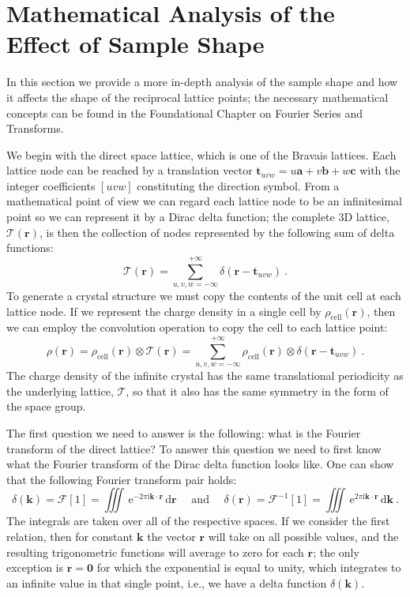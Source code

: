 \section{Mathematical Analysis of the Effect of Sample Shape}\label{\chabbr:sec:sampleshape}
In this section we provide a more in-depth analysis of the sample shape and how it affects the shape of the reciprocal lattice points; the necessary mathematical concepts can be found in the Foundational Chapter on Fourier Series and Transforms.  

We begin with the direct space lattice, which is one of the Bravais lattices.  Each lattice node can be reached by a translation vector $\mathbf{t}_{uvw}=u\mathbf{a}+v\mathbf{b}+w\mathbf{c}$ with the integer coefficients $[uvw]$ constituting the direction symbol.  From a mathematical point of view we can regard each lattice node to be an infinitesimal point so we can represent it by a Dirac delta function; the complete 3D lattice, $\mathcal{T}(\mathbf{r})$, is then the collection of nodes represented by the following sum of delta functions:
\begin{equation}
	\mathcal{T}(\mathbf{r}) = \sum_{u,v,w=-\infty}^{+\infty} \delta(\mathbf{r}-\mathbf{t}_{uvw})\ .\label{\chabbr:eq:directlattice}
\end{equation}
To generate a crystal structure we must copy the contents of the unit cell at each lattice node. If we represent the charge density in a single cell by $\rho_{\text{cell}}(\mathbf{r})$, then we can employ the convolution operation to copy the cell to each lattice point:
\begin{equation}
	\rho(\mathbf{r})=\rho_{\text{cell}}(\mathbf{r})\otimes\mathcal{T}(\mathbf{r})=\sum_{u,v,w=-\infty}^{+\infty} \rho_{\text{cell}}(\mathbf{r})\otimes\delta(\mathbf{r}-\mathbf{t}_{uvw})\ .\label{\chabbr:eq:latticewithcell}
\end{equation}
The charge density of the infinite crystal has the same translational periodicity as the underlying lattice, $\mathcal{T}$, so that it also has the same symmetry in the form of the space group. 

The first question we need to answer is the following: what is the Fourier transform of the direct lattice?  To answer this question we need to first know what the Fourier transform of the Dirac delta function looks like.  One can show that the following Fourier transform pair holds:
\begin{equation}
	\delta(\mathbf{k})=\mathcal{F}[1]=\iiint\,\mathrm{e}^{-2\pi\mathrm{i}\mathbf{k}\cdot\mathbf{r}}\,\mathrm{d}\mathbf{r}\quad\text{ and }\quad \delta(\mathbf{r})=\mathcal{F}^{-1}[1]=\iiint\,\mathrm{e}^{2\pi\mathrm{i}\mathbf{k}\cdot\mathbf{r}}\,\mathrm{d}\mathbf{k}\ .\label{\chabbr:eq:deltaFT}
\end{equation}
The integrals are taken over all of the respective spaces. If we consider the first relation, then for constant $\mathbf{k}$ the vector $\mathbf{r}$ will take on all possible values, and the resulting trigonometric functions will average to zero for each $\mathbf{r}$; the only exception is $\mathbf{r}=\mathbf{0}$ for which the exponential is equal to unity, which integrates to an infinite value in that single point, i.e., we have a delta function $\delta(\mathbf{k})$.  

